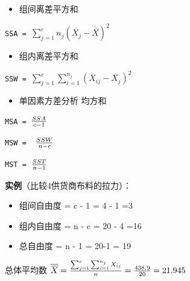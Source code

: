\begin{itemize}
\tightlist
\item
  组间离差平方和\\
\end{itemize}

\texttt{SSA~=~}\(\sum_{j=1}^c n_j(\overline{X_j} - \overline{\overline{X}})^2\)

\begin{description}
\item[]
\end{description}

\begin{itemize}
\tightlist
\item
  组内离差平方和\\
\end{itemize}

\texttt{SSW~=~}\(\sum_{j=1}^c \sum_{i=1}^{n_j} (X_{ij} - \overline{X_j})^2\)

\begin{description}
\item[]
\end{description}

\begin{itemize}
\tightlist
\item
  单因素方差分析 均方和
\end{itemize}

\texttt{MSA~=~}\({SSA \over c -1}\)

\texttt{MSW~=~~}\({SSW \over n -c}\)

\texttt{MST~=~}\({SST \over n -1}\)

\textbf{实例}（比较4供货商布料的拉力）：

\begin{itemize}
\tightlist
\item
  组间自由度 = c - 1 = 4 - 1 =3
\item
  组内自由度 = n - c = 20 - 4 =16
\item
  总自由度 = n - 1 = 20-1 = 19
\end{itemize}

总体平均数
\(\overline{\overline{X}} = {\sum_{j=1}^c \sum_{i=1}^{n_j} X_{ij} \over n} = {438.9 \over 20}= 21.945\)

